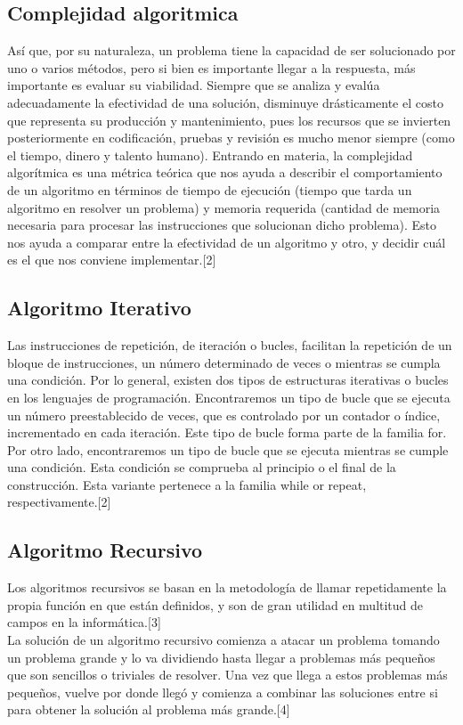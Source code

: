\documentclass[spanish]{article}
\begin{document}
	\subsection{Complejidad algoritmica}
	Así que, por su naturaleza, un problema tiene la capacidad de ser solucionado por uno o varios métodos, pero si bien es importante llegar a la respuesta, más importante es evaluar su viabilidad. Siempre que se analiza y evalúa adecuadamente la efectividad de una solución, disminuye drásticamente el costo que representa su producción y mantenimiento, pues los recursos que se invierten posteriormente en codificación, pruebas y revisión es mucho menor siempre (como el tiempo, dinero y talento humano).	
	Entrando en materia, la complejidad algorítmica es una métrica teórica que nos ayuda a describir el comportamiento de un algoritmo en términos de tiempo de ejecución (tiempo que tarda un algoritmo en resolver un problema) y memoria requerida (cantidad de memoria necesaria para procesar las instrucciones que solucionan dicho problema). Esto nos ayuda a comparar entre la efectividad de un algoritmo y otro, y decidir cuál es el que nos conviene implementar.[2]
	\subsection{Algoritmo Iterativo}
	Las instrucciones de repetición, de iteración o bucles, facilitan la repetición de un bloque de instrucciones, un número determinado de veces o mientras se cumpla una condición.	
	Por lo general, existen dos tipos de estructuras iterativas o bucles en los lenguajes de programación. Encontraremos un tipo de bucle que se ejecuta un número preestablecido de veces, que es controlado por un contador o índice, incrementado en cada iteración. Este tipo de bucle forma parte de la familia for.	
	Por otro lado, encontraremos un tipo de bucle que se ejecuta mientras se cumple una condición. Esta condición se comprueba al principio o el final de la construcción. Esta variante pertenece a la familia while or repeat, respectivamente.[2]
	\subsection{Algoritmo Recursivo}
	Los algoritmos   recursivos   se   basan   en   la   metodología   de   llamar   repetidamente  la  propia  función  en  que  están  definidos,  y  son  de  gran  utilidad  en  multitud de campos en la informática.[3]\\
	La solución de un algoritmo recursivo comienza a atacar un problema tomando un problema grande y lo va dividiendo hasta llegar a problemas más pequeños que son sencillos o triviales de resolver. Una vez que llega a estos problemas más pequeños, vuelve por donde llegó y comienza a combinar las soluciones entre si para obtener la solución al problema más grande.[4]
\end{document}
